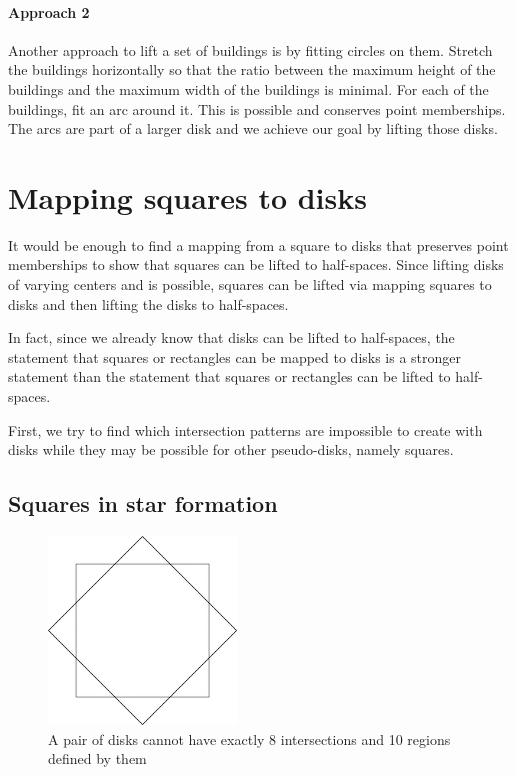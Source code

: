 \documentclass{NSF}
\begin{document}
\paragraph{Approach 2}
Another approach to lift a set of buildings is by fitting circles on them. Stretch the buildings horizontally so that the ratio between the maximum height of the buildings and the maximum width of the buildings is minimal. For each of the buildings, fit an arc around it. This is possible and conserves point memberships. The arcs are part of a larger disk and we achieve our goal by lifting those disks.

\section{Mapping squares to disks}
It would be enough to find a mapping from a square to disks that preserves point memberships to show that squares can be lifted to half-spaces. Since lifting disks of varying centers and is possible, squares can be lifted via mapping squares to disks and then lifting the disks to half-spaces.

In fact, since we already know that disks can be lifted to half-spaces, the statement that squares or rectangles can be mapped to disks is a stronger statement than the statement that squares or rectangles can be lifted to half-spaces. 

First, we try to find which intersection patterns are impossible to create with disks while they may be possible for other pseudo-disks, namely squares.

\subsection{Squares in star formation}

\begin{figure}[ht]
\centering
\includegraphics[width=\textwidth,height=5cm,keepaspectratio]{cocentric-squares}
\caption{ A pair of disks cannot have exactly 8 intersections and 10 regions  defined by them }
\end{figure}
\end{document}
